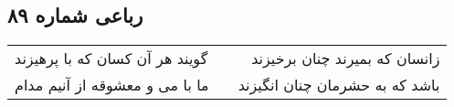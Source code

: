 \begin{center}
\section*{رباعی شماره ۸۹}
\label{sec:sh089}
\begin{longtable}{l p{0.5cm} r}
گویند هر آن کسان که با پرهیزند
&&
زانسان که بمیرند چنان برخیزند
\\
ما با می و معشوقه از آنیم مدام
&&
باشد که به حشرمان چنان انگیزند
\\
\end{longtable}
\end{center}
